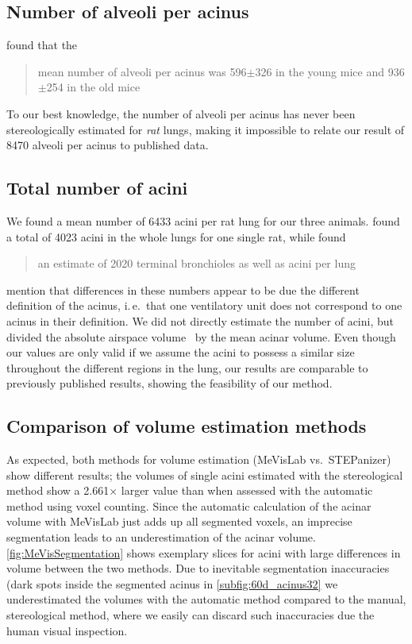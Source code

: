 \documentclass[a4paper,DIV=calc,abstract,english]{scrartcl}
\newcommand{\ie}{i.\,e.\ }
\newcommand{\meantotalnumberofacini}{6433}
\newcommand{\meannumberofalveoli}{8470} %
\newcommand{\difference}{2.661} %
\begin{document}
\subsection{Number of alveoli per acinus}
\citet{Vasilescu2012} found that the \blockquote{mean number of alveoli per acinus was 596\(\pm\)326 in the young mice and 936\(\pm\)254 in the old mice}. To our best knowledge, the number of alveoli per acinus has never been stereologically estimated for \emph{rat} lungs, making it impossible to relate our result of \meannumberofalveoli\xspace alveoli per acinus to published data.

\subsection{Total number of acini}
We found a mean number of \meantotalnumberofacini\xspace acini per rat lung for our three animals.
\citet{Rodriguez1987} found a total of 4023 acini in the whole lungs for one single rat, while \citet{Mercer1987a} found \blockquote{an estimate of 2020 terminal bronchioles as well as acini per lung}.
\citeauthor{Mercer1987a} mention that differences in these numbers appear to be due the different definition of the acinus, \ie that one ventilatory unit does not correspond to one acinus in their definition.
We did not directly estimate the number of acini, but divided the absolute airspace volume~\cite{Tschanz2003} by the mean acinar volume.
Even though our values are only valid if we assume the acini to possess a similar size throughout the different regions in the lung, our results are comparable to previously published results, showing the feasibility of our method.

\subsection{Comparison of volume estimation methods}
As expected, both methods for volume estimation (MeVisLab vs.\ STEPanizer) show different results; the volumes of single acini estimated with the stereological method show a \difference\(\times\) larger value than when assessed with the automatic method using voxel counting.
Since the automatic calculation of the acinar volume with MeVisLab just adds up all segmented voxels, an imprecise segmentation leads to an underestimation of the acinar volume.
\autoref{fig:MeVisSegmentation} shows exemplary slices for acini with large differences in volume between the two methods.
Due to inevitable segmentation inaccuracies (dark spots inside the segmented acinus in \autoref{subfig:60d_acinus32} we underestimated the volumes with the automatic method compared to the manual, stereological method, where we easily can discard such inaccuracies due the human visual inspection.
\end{document}
